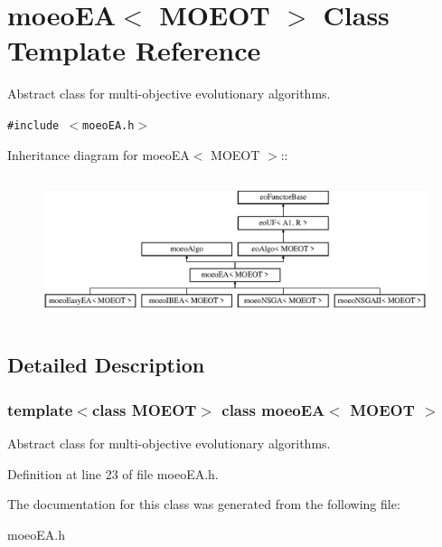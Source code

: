 \section{moeo\-EA$<$ MOEOT $>$ Class Template Reference}
\label{classmoeoEA}
Abstract class for multi-objective evolutionary algorithms.  


{\tt \#include $<$moeo\-EA.h$>$}

Inheritance diagram for moeo\-EA$<$ MOEOT $>$::\begin{figure}[H]
\begin{center}
\leavevmode
\includegraphics[height=4.24242cm]{classmoeoEA}
\end{center}
\end{figure}


\subsection{Detailed Description}
\subsubsection*{template$<$class MOEOT$>$ class moeo\-EA$<$ MOEOT $>$}

Abstract class for multi-objective evolutionary algorithms. 



Definition at line 23 of file moeo\-EA.h.

The documentation for this class was generated from the following file:\begin{CompactItemize}
\item 
moeo\-EA.h\end{CompactItemize}
